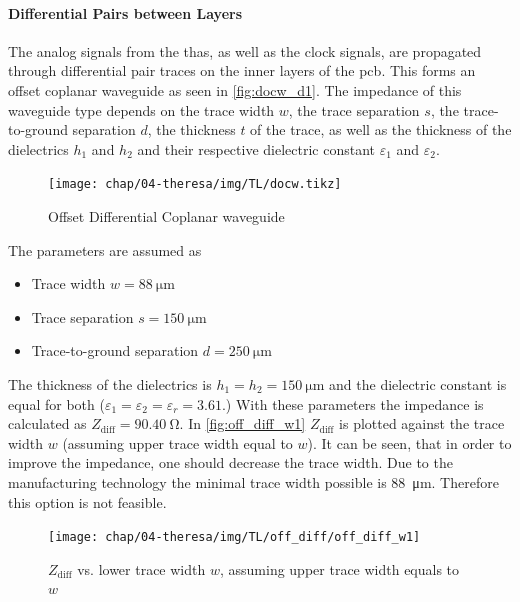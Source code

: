 \paragraph{Differential Pairs between Layers}
The analog signals from the \glspl{tha}, as well as the clock signals, are propagated through differential pair traces on the inner layers of the \gls{pcb}. 
This forms an offset coplanar waveguide as seen in \autoref{fig:docw_d1}.
The impedance of this waveguide type depends on the trace width $w$, the trace separation $s$, the trace-to-ground separation $d$, the thickness $t$ of the trace, as well as the thickness of the dielectrics $h_1$ and $h_2$ and their respective dielectric constant $\varepsilon_1$ and $\varepsilon_2$.

\begin{figure}[tbh]
	\centering
	\texttt{[image: chap/04-theresa/img/TL/docw.tikz]}
	\caption{Offset Differential Coplanar waveguide}
	\label{fig:docw_d1}
\end{figure}

The parameters are assumed as
\begin{itemize}
	\item Trace width $w = \SI{88}{\micro \meter}$ 
	\item Trace separation $s = \SI{150}{\micro \meter}$
	\item Trace-to-ground separation $d = \SI{250}{\micro \meter}$
\end{itemize}
The thickness of the dielectrics is $h_1 = h_2 = \SI{150}{\micro \meter}$  and the dielectric constant is equal for both ($\varepsilon_1 = \varepsilon_2 = \varepsilon_r = 3.61$.)
With these parameters the impedance is calculated as $Z_\text{diff} = \SI{90.40}{\ohm}$.
In \autoref{fig:off_diff_w1} $Z_\text{diff}$ is plotted against the trace width $w$ (assuming upper trace width equal to $w$). It can be seen, that in order to improve the impedance, one should decrease the trace width. 
Due to the manufacturing technology the minimal trace width possible is \SI{88}{\micro \meter}. 
Therefore this option is not feasible.

\begin{figure}[tbh]
	\centering
	\texttt{[image: chap/04-theresa/img/TL/off\_diff/off\_diff\_w1]}
	\caption[DOWG, $Z_\text{diff}$ vs. $w$]{$Z_\text{diff}$ vs. lower trace width $w$, assuming upper trace width equals to $w$}
	\label{fig:off_diff_w1}
\end{figure}


